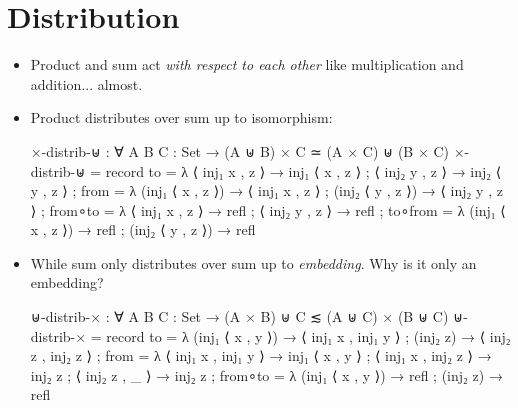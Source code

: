 \documentclass{lecturenotes}
\begin{document}
\newpage
\section{Distribution}
\label{sec:distribution}

\begin{itemize}
\item Product and sum act \emph{with respect to each other} like multiplication and addition... almost.
\item Product distributes over sum up to isomorphism:
\begin{code}
×-distrib-⊎ : ∀ {A B C : Set} → (A ⊎ B) × C ≃ (A × C) ⊎ (B × C)
×-distrib-⊎ =
  record
  {
    to      = λ { ⟨ inj₁ x , z ⟩ → inj₁ ⟨ x , z ⟩ ; ⟨ inj₂ y , z ⟩ → inj₂ ⟨ y , z ⟩}
  ; from    = λ { (inj₁ ⟨ x , z ⟩) → ⟨ inj₁ x , z ⟩ ; (inj₂ ⟨ y , z ⟩) → ⟨ inj₂ y , z ⟩}
  ; from∘to = λ { ⟨ inj₁ x , z ⟩ → refl
                ; ⟨ inj₂ y , z ⟩ → refl
                }
  ; to∘from = λ { (inj₁ ⟨ x , z ⟩) → refl
                ; (inj₂ ⟨ y , z ⟩) → refl
                }
  }    
\end{code}
\item While sum only distributes over sum up to \emph{embedding}.
  Why is it only an embedding?
\begin{code}
⊎-distrib-× : ∀ {A B C : Set} → (A × B) ⊎ C ≲ (A ⊎ C) × (B ⊎ C)
⊎-distrib-× =
  record
  {
    to      = λ { (inj₁ ⟨ x , y ⟩) → ⟨ inj₁ x , inj₁ y ⟩ ; (inj₂ z) → ⟨ inj₂ z , inj₂ z ⟩}
  ; from    = λ { ⟨ inj₁ x , inj₁ y ⟩ → inj₁ ⟨ x , y ⟩
                ; ⟨ inj₁ x , inj₂ z ⟩ → inj₂ z
                ; ⟨ inj₂ z , _ ⟩ → inj₂ z
                }
  ; from∘to = λ { (inj₁ ⟨ x , y ⟩) → refl
                ; (inj₂ z) → refl
                }
  }    
\end{code}
\end{itemize}
\end{document}
